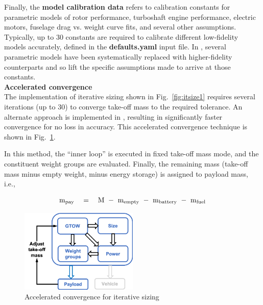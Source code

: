 Finally, the \textbf{model calibration data} refers to calibration constants for parametric models of rotor performance, turboshaft engine performance, electric motors, fuselage drag vs. weight curve fits, and several other assumptions. Typically, up to 30 constants are required to calibrate different low-fidelity models accurately, defined in the \textbf{defaults.yaml} input file. In \hydra, several parametric models have been systematically replaced with higher-fidelity counterparts and so lift the specific assumptions made to arrive at those constants. \\
\textbf{Accelerated convergence} \\
The implementation of iterative sizing shown in Fig.~\ref{fig:itsize1} requires several iterations (up to 30) to converge take-off mass to the required tolerance. An alternate approach is implemented in \hydra, resulting in significantly faster convergence for no loss in accuracy. This accelerated convergence technique is shown in Fig.~\ref{fig:accel_conv}. 

In this method, the ``inner loop'' is executed in fixed take-off mass mode, and the constituent weight groups are evaluated. Finally, the remaining mass (take-off mass minus empty weight, minus energy storage) is assigned to payload mass, i.e., 

\begin{equation}
\textrm{m}_{\rm pay} \quad = \quad \textrm{M} \textrm{ } - \textrm{ } \textrm{m}_{\rm empty} \textrm{ } - \textrm{ } \textrm{m}_{\rm battery} \textrm{ } - \textrm{ } \textrm{m}_{\rm fuel}
\end{equation}

\begin{figure}
\begin{center}
\includegraphics[width=0.5\textwidth]{images/accel_conv.png}
\caption{Accelerated convergence for iterative sizing}
\label{fig:accel_conv}
\end{center}
\end{figure}

